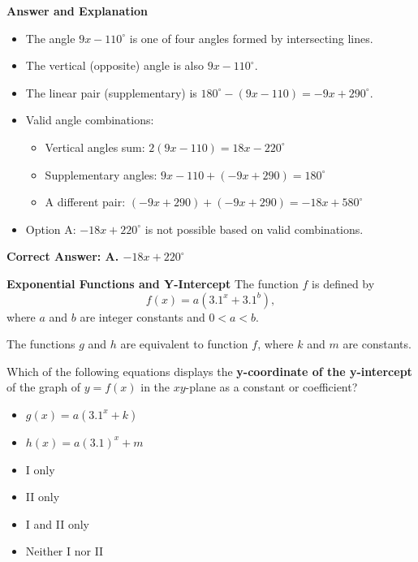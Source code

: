 \documentclass{beamer}
\begin{document}
\begin{frame}{\textbf{Answer and Explanation}}
\begin{itemize}
    \item The angle \(9x - 110^\circ\) is one of four angles formed by intersecting lines.
    \item The vertical (opposite) angle is also \(9x - 110^\circ\).
    \item The linear pair (supplementary) is \(180^\circ - (9x - 110) = -9x + 290^\circ\).
    \item Valid angle combinations:
    \begin{itemize}
        \item Vertical angles sum: \(2(9x - 110) = 18x - 220^\circ\)
        \item Supplementary angles: \(9x - 110 + (-9x + 290) = 180^\circ\)
        \item A different pair: \((-9x + 290) + (-9x + 290) = -18x + 580^\circ\)
    \end{itemize}
    \item Option A: \(-18x + 220^\circ\) is not possible based on valid combinations.
\end{itemize}

\textbf{Correct Answer: A. \(-18x + 220^\circ\)}
\end{frame}


\begin{frame}{\textbf{Exponential Functions and Y-Intercept}}
The function \( f \) is defined by
\[
f(x) = a(3.1^x + 3.1^b),
\]
where \( a \) and \( b \) are integer constants and \( 0 < a < b \).

The functions \( g \) and \( h \) are equivalent to function \( f \), where \( k \) and \( m \) are constants.

Which of the following equations displays the \textbf{y-coordinate of the y-intercept} of the graph of \( y = f(x) \) in the \(xy\)-plane as a constant or coefficient?

\begin{itemize}
    \item[I.] \( g(x) = a(3.1^x + k) \)
    \item[II.] \( h(x) = a(3.1)^x + m \)
\end{itemize}

\begin{itemize}
    \item[A.] I only
    \item[B.] II only
    \item[C.] I and II only
    \item[D.] Neither I nor II
\end{itemize}
\end{frame}
\end{document}
